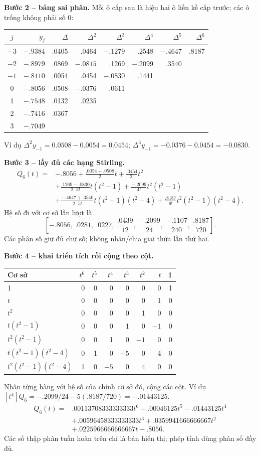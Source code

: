 \textbf{Bước 2 -- bảng sai phân.} Mỗi ô cấp sau là hiệu hai ô liền kề cấp trước; các ô trống không phải số 0:
\begin{center}\small
\begin{tabular}{crrrrrrr}\toprule
$j$&$y_j$&$\Delta$&$\Delta^2$&$\Delta^3$&$\Delta^4$&$\Delta^5$&$\Delta^6$\\\midrule
$-3$&$-.9384$&.0405&.0464&$-.1279$&.2548&$-.4647$&.8187\\
$-2$&$-.8979$&.0869&$-.0815$&.1269&$-.2099$&.3540&\\
$-1$&$-.8110$&.0054&.0454&$-.0830$&.1441&&\\
0&$-.8056$&.0508&$-.0376$&.0611&&&\\
1&$-.7548$&.0132&.0235&&&&\\
2&$-.7416$&.0367&&&&&\\
3&$-.7049$&&&&&&\\\bottomrule
\end{tabular}\end{center}
Ví dụ $\Delta^2y_{-1}=0.0508-0.0054=0.0454$;
$\Delta^3y_{-1}=-0.0376-0.0454=-0.0830$.

\textbf{Bước 3 -- lấy đủ các hạng Stirling.}
\begin{align*}
Q_6(t)={}&-.8056+\frac{.0054+.0508}{2}t+\frac{.0454}{2!}t^2\\
&+\frac{.1269-.0830}{2\cdot3!}t(t^2-1)
 +\frac{-.2099}{4!}t^2(t^2-1)\\
&+\frac{-.4647+.3540}{2\cdot5!}t(t^2-1)(t^2-4)
 +\frac{.8187}{6!}t^2(t^2-1)(t^2-4).
\end{align*}
Hệ số đi với cơ sở lần lượt là
\[
\left[-.8056,\ .0281,\ .0227,\ \frac{.0439}{12},\
\frac{-.2099}{24},\ \frac{-.1107}{240},\ \frac{.8187}{720}\right].
\]
Các phân số giữ đủ chữ số; không nhân/chia giai thừa lần thứ hai.

\textbf{Bước 4 -- khai triển tích rồi cộng theo cột.}
\begin{center}\small
\begin{tabular}{lrrrrrrr}\toprule
Cơ sở&$t^6$&$t^5$&$t^4$&$t^3$&$t^2$&$t$&1\\\midrule
1&0&0&0&0&0&0&1\\
$t$&0&0&0&0&0&1&0\\
$t^2$&0&0&0&0&1&0&0\\
$t(t^2-1)$&0&0&0&1&0&$-1$&0\\
$t^2(t^2-1)$&0&0&1&0&$-1$&0&0\\
$t(t^2-1)(t^2-4)$&0&1&0&$-5$&0&4&0\\
$t^2(t^2-1)(t^2-4)$&1&0&$-5$&0&4&0&0\\\bottomrule
\end{tabular}\end{center}
Nhân từng hàng với hệ số của chính cơ sở đó, cộng các cột. Ví dụ
$[t^4]Q_6=-.2099/24-5(.8187/720)=-.01443125$.
\begin{align*}
Q_6(t)={}&.00113708333333333t^6-.00046125t^5-.01443125t^4\\
&+.00596458333333333t^3+.0359941666666667t^2\\
&+.0225966666666667t-.8056.
\end{align*}
Các số thập phân tuần hoàn trên chỉ là bản hiển thị; phép tính dùng phân số đầy đủ.

